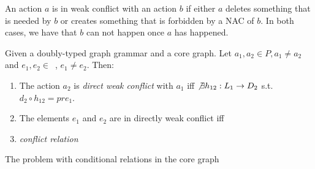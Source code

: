 \begin{intuition} An action $a$ is in weak conflict with an action $b$ if either $a$ deletes something that is needed by $b$ or creates something that is forbidden by a NAC of $b$. In both cases, we have that $b$ can not happen once $a$ has happened.
\end{intuition}


\begin{definition} Given \doublyTypedGraphGrammarCore{} a doubly-typed graph grammar and \coreGraph{} a core graph. Let $a_1, a_2 \in P, a_1 \ne a_2$ and \mbox{$e_1, e_2 \in $ \coreGraph{},} $e_1 \ne e_2$. Then: 

  \begin{enumerate}
    \item The action $a_2$ is \emph{direct weak conflict} with $a_1$ iff $\not\exists h_{12} : L_1 \rightarrow D_2$ s.t. \mbox{$d_2 \circ h_{12} = pre_1$}.

   \item The elements $e_1$ and $e_2$ are in directly weak conflict iff 
    \item \emph{conflict relation}
  \end{enumerate}
\end{definition}

The problem with conditional relations in the core graph

